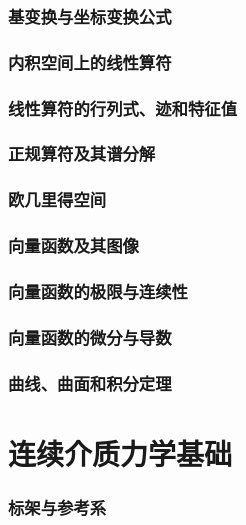\documentclass[zihao=-4,linespread=1.5,heading=true,a4paper,twoside]{ctexart}
\theoremstyle{definition}
\theoremstyle{plain}
\begin{document}
\section{基变换与坐标变换公式}\label{sec:II.5}


\section{内积空间上的线性算符}\label{sec:II.6}


\section{线性算符的行列式、迹和特征值}\label{sec:II.7}


\section{正规算符及其谱分解}\label{sec:II.8}


\section{欧几里得空间}


\section{向量函数及其图像}


\section{向量函数的极限与连续性}


\section{向量函数的微分与导数}


\section{曲线、曲面和积分定理}


\newpage\part{连续介质力学基础}
\section{标架与参考系}

\end{document}
